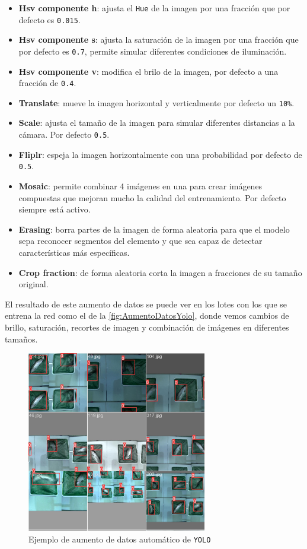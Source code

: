 \begin{itemize}
    \item \textbf{Hsv componente h}: ajusta el \texttt{Hue} de la imagen por una fracción que por defecto es \texttt{0.015}.
    \item \textbf{Hsv componente s}: ajusta la saturación de la imagen por una fracción que por defecto es \texttt{0.7}, permite simular diferentes condiciones de iluminación.
    \item \textbf{Hsv componente v}: modifica el brilo de la imagen, por defecto a una fracción de \texttt{0.4}.
    \item \textbf{Translate}: mueve la imagen horizontal y verticalmente por defecto un \texttt{10\%}.
    \item \textbf{Scale}: ajusta el tamaño de la imagen para simular diferentes distancias a la cámara. Por defecto \texttt{0.5}.
    \item \textbf{Fliplr}: espeja la imagen horizontalmente con una probabilidad por defecto de \texttt{0.5}.
    \item \textbf{Mosaic}: permite combinar 4 imágenes en una para crear imágenes compuestas que mejoran mucho la calidad del entrenamiento. Por defecto siempre está activo.
    \item \textbf{Erasing}: borra partes de la imagen de forma aleatoria para que el modelo sepa reconocer segmentos del elemento y que sea capaz de detectar características más específicas.
    \item \textbf{Crop fraction}: de forma aleatoria corta la imagen a fracciones de su tamaño original.
\end{itemize}
El resultado de este aumento de datos se puede ver en los lotes con los que se entrena la red como el de la \autoref{fig:AumentoDatosYolo}, donde vemos cambios de brillo, saturación, recortes de imagen y 
combinación de imágenes en diferentes tamaños.
\begin{figure}[H]
    \centering
    \includegraphics[width=0.7\textwidth]{images/13/a/EjemploAumento.jpg}
    \caption{Ejemplo de aumento de datos automático de \texttt{YOLO}}
    \label{fig:AumentoDatosYolo}
\end{figure}
\clearpage

